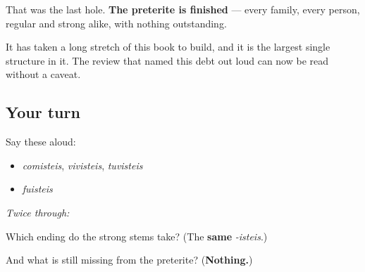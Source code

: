 \begin{culture}
That was the last hole. \textbf{The preterite is finished} — every family, every person, regular and strong alike, with nothing outstanding.

It has taken a long stretch of this book to build, and it is the largest single structure in it. The review that named this debt out loud can now be read without a caveat.
\end{culture}

\subsection*{Your turn}
Say these aloud:

\begin{itemize}
\raggedright
  \item \emph{comisteis}, \emph{vivisteis}, \emph{tuvisteis}
  \item \emph{fuisteis}
\end{itemize}

\emph{Twice through:}

\begin{tcolorbox}[breakable,colback=teal!4,colframe=teal!35!black,title={Before you move on}]
Which ending do the strong stems take? (The \textbf{same} \emph{-isteis}.)

And what is still missing from the preterite? (\textbf{Nothing.})
\end{tcolorbox}
